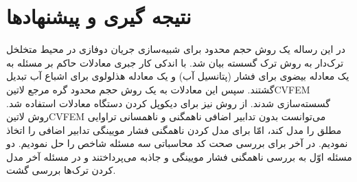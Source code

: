 \chapter{نتیجه گیری و پیشنهادها} 
\label{ch:fasl5}
در این رساله یک روش حجم محدود برای شبیه‌سازی جریان دوفازی در محیط متخلخل ترک‌دار به روش ترک گسسته بیان شد. با اندکی کار جبری معادلات حاکم بر مسئله به یک معادله بیضوی برای فشار (پتانسیل آب) و یک معادله هذلولوی برای اشباع آب تبدیل گشتند. سپس این معادلات به یک روش حجم محدود گره مرجع \text‌لاتین{CVFEM} گسسته‌سازی شدند. از روش  نیز برای دیکوپل کردن دستگاه معادلات استفاده شد. روش \text‌لاتین{CVFEM} می‌توانست بدون تدابیر اضافی ناهمگنی و ناهمسانی تراوایی مطلق را مدل کند، امّا برای مدل کردن ناهمگنی فشار مویینگی تدابیر اضافی را اتخاذ نمودیم. در آخر برای بررسی صحت کد محاسباتی سه مسئله شاخص را حل نمودیم. دو مسئله اوّل به بررسی ناهمگنی فشار مویینگی و جاذبه می‌پرداختند و در مسئله آخر مدل کردن ترک‌ها بررسی گشت. 

